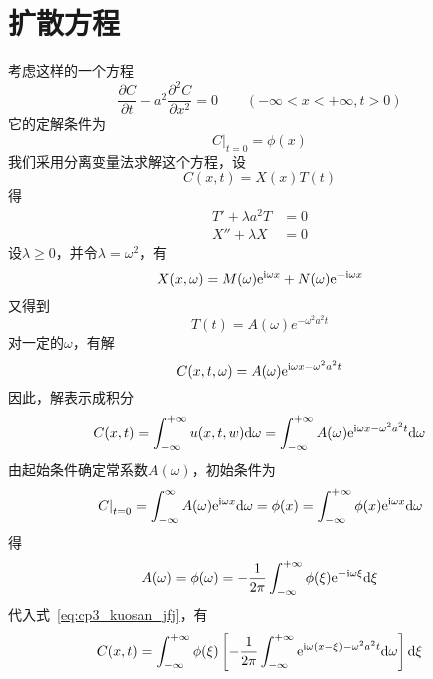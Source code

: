 \section{扩散方程}
考虑这样的一个方程
\begin{equation}
 \dfrac{\partial C}{\partial t}-a^2\dfrac{\partial^2 C}{\partial x^2}=0\qquad(-\infty < x < +\infty,t>0)
\end{equation}
它的定解条件为
\begin{equation}
 \left.C\right|_{t=0}=\phi(x)
\end{equation}
我们采用分离变量法求解这个方程，设
\begin{equation}
 C(x,t)=X(x)T(t)
\end{equation}
得
\begin{align}
T'+\lambda a^2 T & =0\\
X'' + \lambda X &=0
\end{align}
设$\lambda\geq0$，并令$\lambda=\omega^2$，有
\begin{equation}
 X(x,\omega)=M(\omega)\mathrm{e}^{\mathrm{i}\omega x}+N(\omega)\mathrm{e}^{-\mathrm{i}\omega x}
\end{equation}
又得到
\begin{equation}
 T(t)=A(\omega)e^{-\omega^2 a^2 t}
\end{equation}
对一定的$\omega$，有解
\begin{equation}
 C(x,t,\omega)=A(\omega)\mathrm{e}^{\mathrm{i}\omega x-\omega^2 a^2 t}
\end{equation}
因此，解表示成积分
\begin{equation}\label{eq:cp3_kuosan_jfj}
 C(x,t)=\int_{-\infty}^{+\infty}u(x,t,w)\mathrm{d}\omega 
 = \int_{-\infty}^{+\infty}A(\omega)\mathrm{e}^{\mathrm{i}\omega x-\omega^2 a^2 t}\mathrm{d}\omega
\end{equation}
由起始条件确定常系数$A(\omega)$，初始条件为
\begin{equation}
 \left.C\right|_{t=0} = \int_{-\infty}^{\infty} A(\omega)\mathrm{e}^{\mathrm{i}\omega x}\mathrm{d}\omega
 =\phi(x)=\int_{-\infty}^{+\infty}\phi(x)\mathrm{e}^{\mathrm{i}\omega x}\mathrm{d}\omega
\end{equation}
得
\begin{equation}
 A(\omega)=\phi(\omega)=-\dfrac{1}{2\pi}\int_{-\infty}^{+\infty}\phi(\xi)
 \mathrm{e}^{-\mathrm{i}\omega\xi}\mathrm{d}\xi
\end{equation}
代入式~\ref{eq:cp3_kuosan_jfj}，有
\begin{equation}\label{eq:cp3_kuosan_jiex}
 C(x,t)=\int_{-\infty}^{+\infty}\phi(\xi)
 \left[-\dfrac{1}{2\pi}\int_{-\infty}^{+\infty}\mathrm{e}^{\mathrm{i}\omega(x-\xi)-\omega^2a^2t}\mathrm{d}\omega\right]\mathrm{d}\xi
\end{equation}\par
